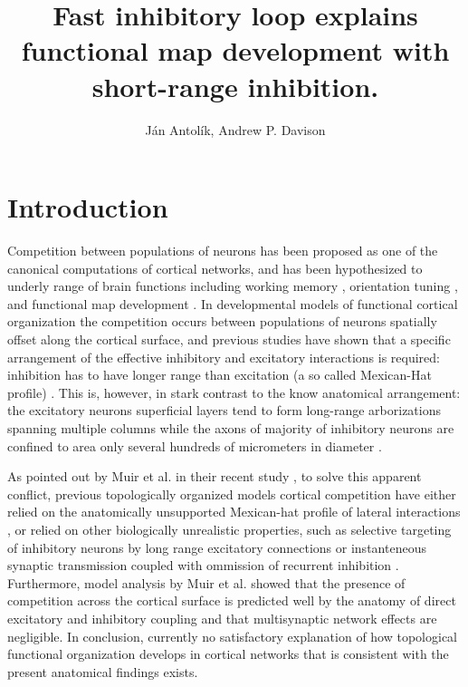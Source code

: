\documentclass[a4paper,10pt]{article}
\title{Fast inhibitory loop explains functional map development with short-range inhibition.}
\author{J\'an Antol\'ik, Andrew P. Davison}
\begin{document}
 \maketitle
{}


\section{Introduction}

Competition between populations of neurons has been proposed as one of the canonical computations of cortical 
networks, and has been hypothesized to underly range of brain functions including working memory \cite{Amit1995,Durstewitz2000},
orientation tuning \cite{Somers1995,Ben-Yishai1995}, and functional map development \cite{VonderMalsburg1973,Antolik2011}.
In developmental models of functional cortical organization the competition occurs between populations of neurons spatially offset 
along the cortical surface, and previous studies have shown that a specific arrangement of the effective inhibitory and excitatory 
interactions is required: inhibition has to have longer range than excitation (a so called Mexican-Hat profile) \cite{Muir2014}.
This is, however, in stark contrast to the know anatomical arrangement: the excitatory neurons superficial layers tend to form 
long-range arborizations spanning multiple columns while the axons of majority of inhibitory neurons are confined to area
only several hundreds of micrometers in diameter \cite{Buzas2006,Budd2001}.


As pointed out by Muir et al. in their recent study \cite{Muir2014}, to solve this apparent conflict, previous topologically organized models cortical competition have either relied on the anatomically unsupported Mexican-hat profile of lateral interactions \cite{VonderMalsburg1973,CMVC}, or relied on other biologically unrealistic properties, such as selective targeting of inhibitory neurons by long range excitatory connections \cite{?} or instanteneous synaptic transmission coupled with ommission of recurrent inhibition \cite{Kang2003,Levy2011}. Furthermore, model analysis by Muir et al. \cite{Muir2014} showed that the presence of competition across the cortical surface is predicted well by the anatomy of direct excitatory and inhibitory coupling and that multisynaptic network effects are negligible. In conclusion, currently no satisfactory explanation of how topological functional organization develops in cortical networks that is consistent with the present anatomical findings exists. 
\end{document}
